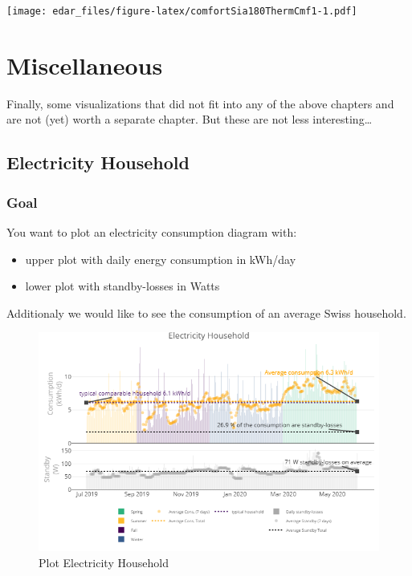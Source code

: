 \documentclass[
  a4paperpaper,
]{book}
\providecommand{\tightlist}{%
  \setlength{\itemsep}{0pt}\setlength{\parskip}{0pt}}
\begin{document}
\texttt{[image: edar\_files/figure-latex/comfortSia180ThermCmf1-1.pdf]}

\hypertarget{miscellaneous}{%
\chapter{Miscellaneous}\label{miscellaneous}}

Finally, some visualizations that did not fit into any of the above chapters and are not (yet) worth a separate chapter. But these are not less interesting\ldots{}

\newpage

\hypertarget{electricity-household}{%
\section{Electricity Household}\label{electricity-household}}

\hypertarget{goal-21}{%
\subsection{Goal}\label{goal-21}}

You want to plot an electricity consumption diagram with:

\begin{itemize}
\tightlist
\item
  upper plot with daily energy consumption in kWh/day
\item
  lower plot with standby-losses in Watts
\end{itemize}

Additionaly we would like to see the consumption of an average Swiss household.

\begin{figure}
\includegraphics[width=0.7\linewidth]{images/eleHousehold} \caption{Plot Electricity Household}\label{fig:unnamed-chunk-31}
\end{figure}
\end{document}
